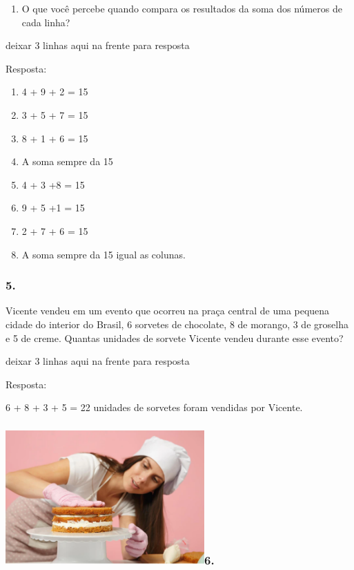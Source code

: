 \begin{enumerate}
\def\labelenumi{\alph{enumi})}
\item
  O que você percebe quando compara os resultados da soma dos números de
  cada linha?
\end{enumerate}

deixar 3 linhas aqui na frente para resposta

Resposta:

\begin{enumerate}
\def\labelenumi{\alph{enumi})}
\item
  4 + 9 + 2 = 15
\item
  3 + 5 + 7 = 15
\item
  8 + 1 + 6 = 15
\item
  A soma sempre da 15
\item
  4 + 3 +8 = 15
\item
  9 + 5 +1 = 15
\item
  2 + 7 + 6 = 15
\item
  A soma sempre da 15 igual as colunas.
\end{enumerate}

\subsubsection{5.}\label{section-20}

Vicente vendeu em um evento que ocorreu na praça central de uma pequena
cidade do interior do Brasil, 6 sorvetes de chocolate, 8 de morango, 3
de groselha e 5 de creme. Quantas unidades de sorvete Vicente vendeu
durante esse evento?

deixar 3 linhas aqui na frente para resposta

Resposta:

6 + 8 + 3 + 5 = 22 unidades de sorvetes foram vendidas por Vicente.

\subsubsection[6.
]{\texorpdfstring{\protect\includegraphics[width=3.00000in,height=2.02528in]{media/image22.png}6.
}{6. }}\label{section-21}

